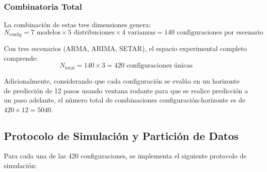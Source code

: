 \subsubsection{Combinatoria Total}

La combinación de estas tres dimensiones genera:
\begin{equation}
N_{\text{config}} = 7 \text{ modelos} \times 5 \text{ distribuciones} \times 4 \text{ varianzas} = 140 \text{ configuraciones por escenario}
\end{equation}

Con tres escenarios (ARMA, ARIMA, SETAR), el espacio experimental completo comprende:
\begin{equation}
N_{\text{total}} = 140 \times 3 = 420 \text{ configuraciones únicas}
\end{equation}

Adicionalmente, considerando que cada configuración se evalúa en un horizonte de predicción de 12 pasos usando ventana rodante para que se realice predicción a un paso adelante, el número total de combinaciones configuración-horizonte es de $420 \times 12 = 5040$.

\subsection{Protocolo de Simulación y Partición de Datos}
\label{subsec:protocolo_simulacion}

Para cada una de las 420 configuraciones, se implementa el siguiente protocolo de simulación:

